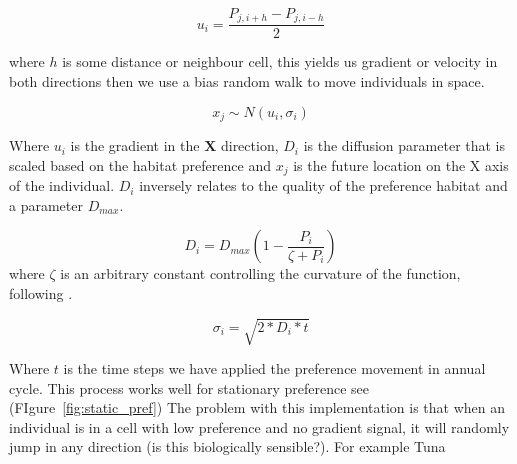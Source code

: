\begin{equation}
u_i = \frac{P_{j, i + h} - P_{j, i - h}}{2}
\end{equation}

where $h$ is some distance or neighbour cell, this yields us gradient or velocity in both directions then we use a bias random walk to move individuals in space.

\begin{equation}
x_j \sim N(u_i, \sigma_i)
\end{equation}

Where $u_i$ is the gradient in the $\textbf{X}$ direction, $D_{i}$ is the diffusion parameter that is scaled based on the habitat preference and $x_j$ is the future location on the X axis of the individual. $D_{i}$ inversely relates to the quality of the preference habitat and a parameter $D_{max}$.

\begin{equation}
D_i = D_{max}\left(1 - \frac{P_i}{\zeta + P_i}\right)
\end{equation}
where $\zeta$ is an arbitrary constant controlling the curvature of the function, following \cite{Bertignac1998}.

\begin{equation}
\sigma_i = \sqrt{2 * D_i * t}
\end{equation}

Where $t$ is the time steps we have applied the preference movement in annual cycle. This process works well for stationary preference see (FIgure~\ref{fig:static_pref}) The problem with this implementation is that when an individual is in a cell with low preference and no gradient signal, it will randomly jump in any direction (is this biologically sensible?). For example Tuna

